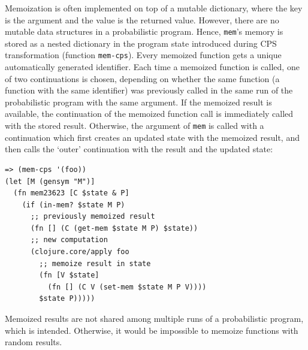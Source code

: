 \documentclass[sigconf]{acmart}
\begin{document}
Memoization is often implemented on top of a mutable
dictionary, where the key is the argument  and the value is
the returned value. However, there are no mutable data
structures in a probabilistic program. Hence, \texttt{mem}'s
memory is stored as a nested dictionary in the program state
introduced during CPS transformation (function \texttt{mem-cps}).  
Every memoized function gets a
unique automatically generated identifier. Each time a memoized
function is called, one of two continuations is chosen,
depending on whether the same function (a function with the same
identifier) was previously called in the same run of the
probabilistic program with the same argument. If the memoized
result is available, the continuation of the memoized function
call is immediately called with the stored result. Otherwise,
the argument of \texttt{mem} is called with a continuation which
first creates an updated state with the memoized result, and
then calls the `outer' continuation with the result and the
updated state:
\begin{lstlisting}[style=default]
=> (mem-cps '(foo))
(let [M (gensym "M")]
  (fn mem23623 [C $state & P]
    (if (in-mem? $state M P)
      ;; previously memoized result
      (fn [] (C (get-mem $state M P) $state))
      ;; new computation
      (clojure.core/apply foo
        ;; memoize result in state
        (fn [V $state]
          (fn [] (C V (set-mem $state M P V))))
        $state P)))))
\end{lstlisting}

Memoized results are not shared among multiple runs of a
probabilistic program, which is intended. Otherwise, it would be
impossible to memoize functions with random results. 

\iftoggle{full}{\subsubsection{Continuations}}{\subsection{Managing stack size}}
\label{seq:continuations}
\end{document}
